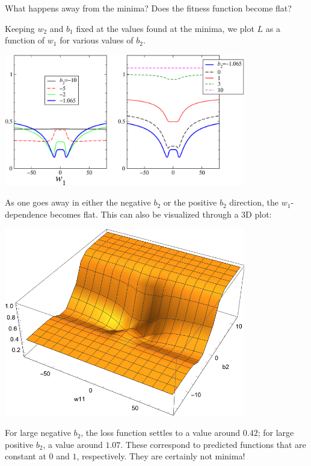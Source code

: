 \documentclass[12pt,a4paper]{article}
\begin{document}
What happens away from the minima?  Does the fitness function become flat?  

Keeping $w_2$ and $b_1$ fixed at the values found at the minima, we plot $L$ as a function of $w_1$
for various values of $b_2$.  


\smallskip

\begin{center}
\includegraphics[width=0.79\textwidth]{Images/3node_largedomain_fitness_vs_w1_varyb2_a_01.pdf}
\end{center}

As one goes away in either the negative $b_2$ or the positive $b_2$ direction, the $w_1$-dependence
becomes flat.   This can also be visualized through a 3D plot:

\smallskip

\begin{center}
\includegraphics[width=0.79\textwidth]{Images/3node_largedomain_fitness_vs_w1_b2_3dplot.pdf}
\end{center}

For large negative $b_2$, the loss function settles to a value around $0.42$;  for large positive
$b_2$, a value around $1.07$.  These correspond to predicted functions that are constant at $0$ and
$1$, respectively.  They are certainly not minima!   
\end{document}
